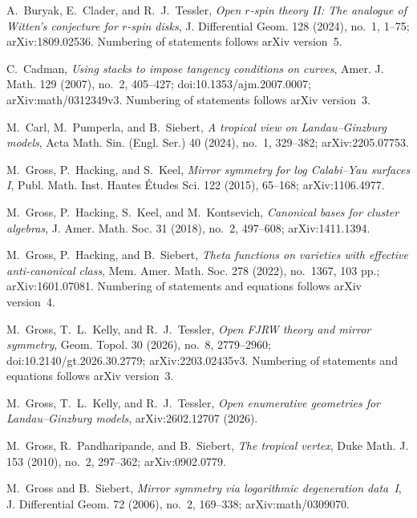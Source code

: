  A.~Buryak, E.~Clader, and R.~J.~Tessler,
\emph{Open $r$-spin theory II: The analogue of Witten's conjecture for
$r$-spin disks}, J. Differential Geom. 128 (2024), no.~1, 1--75;
arXiv:1809.02536.  Numbering of statements follows arXiv version~5.

 C.~Cadman,
\emph{Using stacks to impose tangency conditions on curves},
Amer. J. Math. 129 (2007), no.~2, 405--427; doi:10.1353/ajm.2007.0007;
arXiv:math/0312349v3.  Numbering of statements follows arXiv version~3.

 M.~Carl, M.~Pumperla, and B.~Siebert,
\emph{A tropical view on Landau--Ginzburg models},
Acta Math. Sin. (Engl. Ser.) 40 (2024), no.~1, 329--382;
arXiv:2205.07753.

 M.~Gross, P.~Hacking, and S.~Keel,
\emph{Mirror symmetry for log Calabi--Yau surfaces I},
Publ. Math. Inst. Hautes \'Etudes Sci. 122 (2015), 65--168; arXiv:1106.4977.

 M.~Gross, P.~Hacking, S.~Keel, and
M.~Kontsevich, \emph{Canonical bases for cluster algebras},
J. Amer. Math. Soc. 31 (2018), no.~2, 497--608; arXiv:1411.1394.

 M.~Gross, P.~Hacking, and B.~Siebert,
\emph{Theta functions on varieties with effective anti-canonical class},
Mem. Amer. Math. Soc. 278 (2022), no.~1367, 103 pp.; arXiv:1601.07081.
Numbering of statements and equations follows arXiv version~4.

 M.~Gross, T.~L.~Kelly, and R.~J.~Tessler,
\emph{Open FJRW theory and mirror symmetry}, Geom. Topol. 30 (2026), no.~8,
2779--2960; doi:10.2140/gt.2026.30.2779; arXiv:2203.02435v3.  Numbering of
statements and equations follows arXiv version~3.

 M.~Gross, T.~L.~Kelly, and R.~J.~Tessler,
\emph{Open enumerative geometries for Landau--Ginzburg models},
arXiv:2602.12707 (2026).

 M.~Gross, R.~Pandharipande,
and B.~Siebert, \emph{The tropical vertex}, Duke Math. J. 153 (2010),
no.~2, 297--362; arXiv:0902.0779.

 M.~Gross and B.~Siebert,
\emph{Mirror symmetry via logarithmic degeneration data~I},
J. Differential Geom. 72 (2006), no.~2, 169--338; arXiv:math/0309070.

